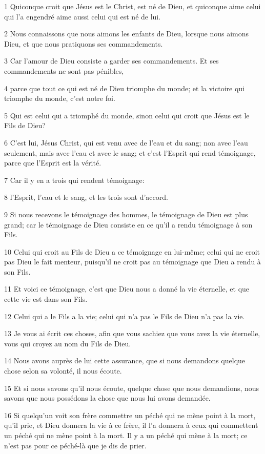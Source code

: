 \par 1 Quiconque croit que Jésus est le Christ, est né de Dieu, et quiconque aime celui qui l'a engendré aime aussi celui qui est né de lui.
\par 2 Nous connaissons que nous aimons les enfants de Dieu, lorsque nous aimons Dieu, et que nous pratiquons ses commandements.
\par 3 Car l'amour de Dieu consiste a garder ses commandements. Et ses commandements ne sont pas pénibles,
\par 4 parce que tout ce qui est né de Dieu triomphe du monde; et la victoire qui triomphe du monde, c'est notre foi.
\par 5 Qui est celui qui a triomphé du monde, sinon celui qui croit que Jésus est le Fils de Dieu?
\par 6 C'est lui, Jésus Christ, qui est venu avec de l'eau et du sang; non avec l'eau seulement, mais avec l'eau et avec le sang; et c'est l'Esprit qui rend témoignage, parce que l'Esprit est la vérité.
\par 7 Car il y en a trois qui rendent témoignage:
\par 8 l'Esprit, l'eau et le sang, et les trois sont d'accord.
\par 9 Si nous recevons le témoignage des hommes, le témoignage de Dieu est plus grand; car le témoignage de Dieu consiste en ce qu'il a rendu témoignage à son Fils.
\par 10 Celui qui croit au Fils de Dieu a ce témoignage en lui-même; celui qui ne croit pas Dieu le fait menteur, puisqu'il ne croit pas au témoignage que Dieu a rendu à son Fils.
\par 11 Et voici ce témoignage, c'est que Dieu nous a donné la vie éternelle, et que cette vie est dans son Fils.
\par 12 Celui qui a le Fils a la vie; celui qui n'a pas le Fils de Dieu n'a pas la vie.
\par 13 Je vous ai écrit ces choses, afin que vous sachiez que vous avez la vie éternelle, vous qui croyez au nom du Fils de Dieu.
\par 14 Nous avons auprès de lui cette assurance, que si nous demandons quelque chose selon sa volonté, il nous écoute.
\par 15 Et si nous savons qu'il nous écoute, quelque chose que nous demandions, nous savons que nous possédons la chose que nous lui avons demandée.
\par 16 Si quelqu'un voit son frère commettre un péché qui ne mène point à la mort, qu'il prie, et Dieu donnera la vie à ce frère, il l'a donnera à ceux qui commettent un péché qui ne mène point à la mort. Il y a un péché qui mène à la mort; ce n'est pas pour ce péché-là que je dis de prier.
